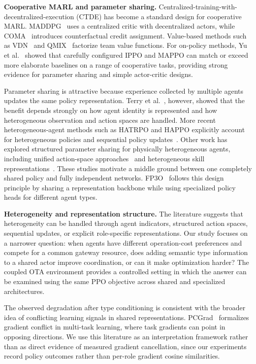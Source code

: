\documentclass[conference]{IEEEtran}
\begin{document}
\textbf{Cooperative MARL and parameter sharing.}
Centralized-training-with-decentralized-execution (CTDE) has become a standard design
for cooperative MARL. MADDPG~\cite{b10} uses a centralized critic with decentralized
actors, while COMA~\cite{b11} introduces counterfactual credit assignment. Value-based
methods such as VDN~\cite{b12} and QMIX~\cite{b13} factorize team value functions.
For on-policy methods, Yu et al.~\cite{b3} showed that carefully configured IPPO and
MAPPO can match or exceed more elaborate baselines on a range of cooperative tasks,
providing strong evidence for parameter sharing and simple actor-critic designs.

Parameter sharing is attractive because experience collected by multiple agents updates
the same policy representation. Terry et al.~\cite{b14}, however, showed that the
benefit depends strongly on how agent identity is represented and how heterogeneous
observation and action spaces are handled. More recent heterogeneous-agent methods
such as HATRPO and HAPPO explicitly account for heterogeneous policies and sequential
policy updates~\cite{harl}. Other work has explored structured parameter sharing for
physically heterogeneous agents, including unified action-space approaches~\cite{uas}
and heterogeneous skill representations~\cite{hskill}. These studies motivate a
middle ground between one completely shared policy and fully independent networks.
FP3O~\cite{b2} follows this design principle by sharing a representation backbone
while using specialized policy heads for different agent types.

\textbf{Heterogeneity and representation structure.}
The literature suggests that heterogeneity can be handled through agent indicators,
structured action spaces, sequential updates, or explicit role-specific representations.
Our study focuses on a narrower question: when agents have different operation-cost
preferences and compete for a common gateway resource, does adding semantic type
information to a shared actor improve coordination, or can it make optimization harder?
The coupled OTA environment provides a controlled setting in which the answer can be
examined using the same PPO objective across shared and specialized architectures.

The observed degradation after type conditioning is consistent with the broader idea of
conflicting learning signals in shared representations. PCGrad~\cite{yu2020pcgrad}
formalizes gradient conflict in multi-task learning, where task gradients can point in
opposing directions. We use this literature as an interpretation framework rather than
as direct evidence of measured gradient cancellation, since our experiments record
policy outcomes rather than per-role gradient cosine similarities.
\end{document}
